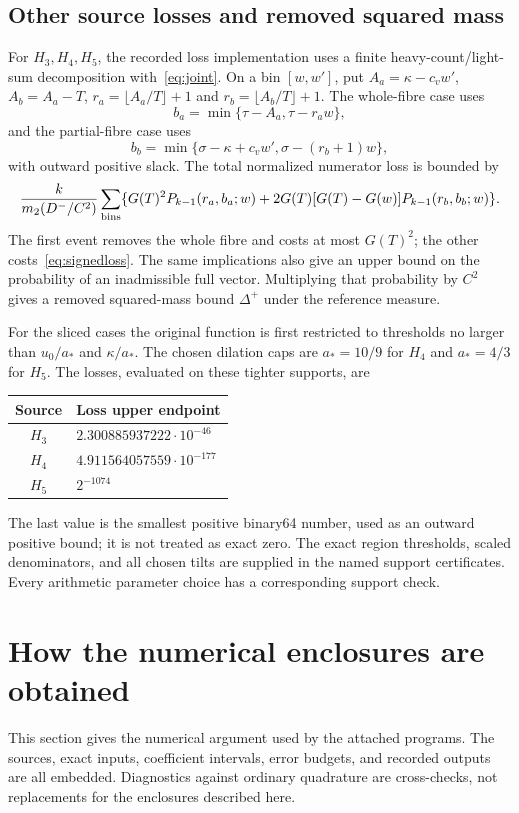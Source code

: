 \documentclass[11pt,a4paper]{article}
\theoremstyle{definition}\newtheorem{definition}[theorem]{Definition}
\theoremstyle{remark}\newtheorem{remark}[theorem]{Remark}
\numberwithin{equation}{section}
\begin{document}
\subsection{Other source losses and removed squared mass}
For $H_3,H_4,H_5$, the recorded loss implementation uses a finite heavy-count/light-sum decomposition with~\eqref{eq:joint}. On a bin $[w,w']$, put
$A_a=\kappa-c_vw'$, $A_b=A_a-T$, $r_a=\lfloor A_a/T\rfloor+1$ and $r_b=\lfloor A_b/T\rfloor+1$. The whole-fibre case uses
\[
 b_a=\min\{\tau-A_a,\tau-r_aw\},
\]
and the partial-fibre case uses
\[
 b_b=\min\{\sigma-\kappa+c_vw',\sigma-(r_b+1)w\},
\]
with outward positive slack. The total normalized numerator loss is bounded by
\begin{equation}\label{eq:coarseloss}
 \frac{k}{m_2(D^-/C^2)}
 \sum_{\rm bins}\{G(T)^2P_{k-1}(r_a,b_a;w)
 +2G(T)[G(T)-G(w)]P_{k-1}(r_b,b_b;w)\}.
\end{equation}
The first event removes the whole fibre and costs at most $G(T)^2$; the other costs~\eqref{eq:signedloss}. The same implications also give an upper bound on the probability of an inadmissible full vector. Multiplying that probability by $C^2$ gives a removed squared-mass bound $\Delta^+$ under the reference measure.

For the sliced cases the original function is first restricted to thresholds no larger than $u_0/a_*$ and $\kappa/a_*$. The chosen dilation caps are $a_*=10/9$ for $H_4$ and $a_*=4/3$ for $H_5$. The losses, evaluated on these tighter supports, are
\begin{center}\begin{tabular}{@{}cl@{}}\toprule
Source&Loss upper endpoint\\\midrule
$H_3$&$2.300885937222\cdot10^{-46}$\\
$H_4$&$4.911564057559\cdot10^{-177}$\\
$H_5$&$2^{-1074}$\\\bottomrule\end{tabular}\end{center}
The last value is the smallest positive binary64 number, used as an outward positive bound; it is not treated as exact zero. The exact region thresholds, scaled denominators, and all chosen tilts are supplied in the named support certificates. Every arithmetic parameter choice has a corresponding support check.

\section{How the numerical enclosures are obtained}\label{sec:numerics}
This section gives the numerical argument used by the attached programs. The sources, exact inputs, coefficient intervals, error budgets, and recorded outputs are all embedded. Diagnostics against ordinary quadrature are cross-checks, not replacements for the enclosures described here.
\end{document}
